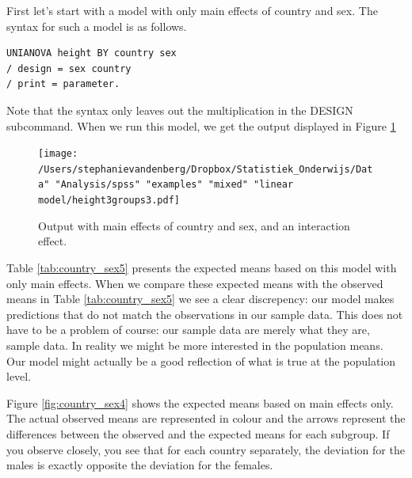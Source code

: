 \documentclass[]{book}\usepackage[]{graphicx}\usepackage[]{color}
\begin{document}
First let's start with a model with only main effects of country and sex. The syntax for such a model is as follows.

\begin{verbatim}
UNIANOVA height BY country sex 
/ design = sex country 
/ print = parameter.
\end{verbatim}

Note that the syntax only leaves out the multiplication in the DESIGN subcommand. When we run this model, we get the output displayed in Figure \ref{fig:interactionheightcountrysexMAIN}

\begin{figure}[h]
    \begin{center}
       \texttt{[image: /Users/stephanievandenberg/Dropbox/Statistiek\_Onderwijs/Data" "Analysis/spss" "examples" "mixed" "linear model/height3groups3.pdf]}
    \end{center}
    \label{fig:interactionheightcountrysexMAIN}
    \caption{Output with main effects of country and sex, and an interaction effect.}
\end{figure}

Table \ref{tab:country_sex5} presents the expected means based on this model with only main effects. When we compare these expected means with the observed means in Table \ref{tab:country_sex5} we see a clear discrepency: our model makes predictions that do not match the observations in our sample data. This does not have to be a problem of course: our sample data are merely what they are, sample data. In reality we might be more interested in the population means. Our model might actually be a good reflection of what is true at the population level. 

Figure \ref{fig:country_sex4} shows the expected means based on main effects only. The actual observed means are represented in colour and the arrows represent the differences between the observed and the expected means for each subgroup. If you observe closely, you see that for each country separately, the deviation for the males is exactly opposite the deviation for the females. 
\end{document}

